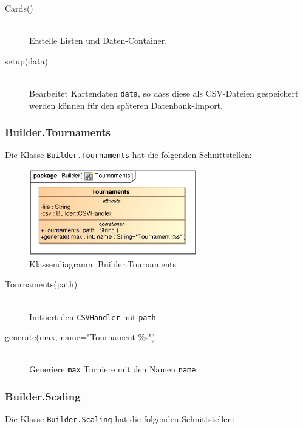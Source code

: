 \begin{description}
    \item[Cards()] \hfill \\
    Erstelle Listen und Daten-Container.
    
    \item[setup(data)] \hfill \\
    Bearbeitet Kartendaten \verb|data|, so dass diese als \ac{CSV}-Dateien gespeichert werden können für den späteren Datenbank-Import.
\end{description}



\subsubsection{Builder.Tournaments}
Die Klasse \verb|Builder.Tournaments| hat die folgenden Schnittstellen:

\begin{figure}[H]
    \myfloatalign
    \includegraphics[width=0.65\textwidth]{gfx/MtGDeepAnalysis/Tournaments.eps}
    \caption{Klassendiagramm Builder.Tournaments}
    \label{fig:class:builder.Tournaments}
\end{figure}

\begin{description}
    \item[Tournaments(path)] \hfill \\
      Initiiert den \verb|CSVHandler| mit \verb|path|
     
    \item[generate(max, name="Tournament \%s")] \hfill \\
    Generiere \verb|max| Turniere mit den Namen \verb|name|
\end{description}

\subsubsection{Builder.Scaling}
Die Klasse \verb|Builder.Scaling| hat die folgenden Schnittstellen:

